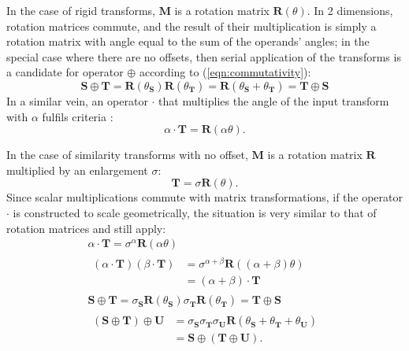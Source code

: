 		In the case of rigid transforms, $\mathbf{M}$ is a rotation matrix $\mathbf{R}(\theta)$. In 2 dimensions, rotation matrices commute, and the result of their multiplication is simply a rotation matrix with angle equal to the sum of the operands' angles; in the special case where there are no offsets, then serial application of the transforms is a candidate for operator $\oplus$ according to (\ref{eqn:commutativity}):
		\begin{equation}
			\mathbf{S} \oplus \mathbf{T} = \mathbf{R}(\theta_\mathbf{S})\mathbf{R}(\theta_\mathbf{T}) = \mathbf{R}(\theta_\mathbf{S} + \theta_\mathbf{T}) = \mathbf{T} \oplus \mathbf{S}
		\end{equation}
		In a similar vein, an operator $\cdot$ that multiplies the angle of the input transform with $\alpha$ fulfils criteria :
    \begin{equation}
      \alpha \cdot \mathbf{T} = \mathbf{R}(\alpha\theta).
    \end{equation}
		
        In the case of similarity transforms with no offset, $\mathbf{M}$ is a rotation matrix $\mathbf{R}$ multiplied by an enlargement $\sigma$:
        \begin{equation}
            \mathbf{T} = \sigma\mathbf{R}(\theta).
        \end{equation}
        Since scalar multiplications commute with matrix transformations, if the operator $\cdot$ is constructed to scale geometrically, the situation is very similar to that of rotation matrices and  still apply:
        \begin{gather}
          \alpha \cdot \mathbf{T} = \sigma^{\alpha}\mathbf{R}(\alpha\theta) \\
          \begin{split}
            (\alpha \cdot \mathbf{T})(\beta \cdot \mathbf{T}) &= \sigma^{\alpha + \beta}\mathbf{R}((\alpha + \beta)\theta) \\
                                                              &= (\alpha + \beta) \cdot \mathbf{T}
          \end{split} \\
          \mathbf{S} \oplus \mathbf{T} = \sigma_\mathbf{S}\mathbf{R}(\theta_\mathbf{S})\sigma_\mathbf{T}\mathbf{R}(\theta_\mathbf{T}) = \mathbf{T} \oplus \mathbf{S} \\
          \begin{split}
      			(\mathbf{S} \oplus \mathbf{T}) \oplus \mathbf{U} &= \sigma_\mathbf{S}\sigma_\mathbf{T}\sigma_\mathbf{U}\mathbf{R}(\theta_\mathbf{S} + \theta_\mathbf{T} + \theta_\mathbf{U}) \\
                                                             &= \mathbf{S} \oplus (\mathbf{T} \oplus \mathbf{U}).
          \end{split}
        \end{gather}
		
